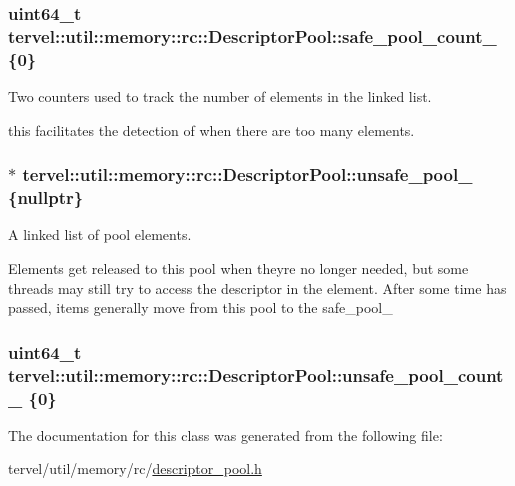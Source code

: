 \subsubsection[{safe\+\_\+pool\+\_\+count\+\_\+}]{\setlength{\rightskip}{0pt plus 5cm}uint64\+\_\+t tervel\+::util\+::memory\+::rc\+::\+Descriptor\+Pool\+::safe\+\_\+pool\+\_\+count\+\_\+ \{0\}\hspace{0.3cm}{\ttfamily [private]}}\label{classtervel_1_1util_1_1memory_1_1rc_1_1_descriptor_pool_a121f3c807724ee68f21faf5e659c2cf7}


Two counters used to track the number of elements in the linked list. 

this facilitates the detection of when there are too many elements. \hypertarget{classtervel_1_1util_1_1memory_1_1rc_1_1_descriptor_pool_a850e99b50092270ccc5e8529cffe294b}{}
\subsubsection[{unsafe\+\_\+pool\+\_\+}]{$\ast$ tervel\+::util\+::memory\+::rc\+::\+Descriptor\+Pool\+::unsafe\+\_\+pool\+\_\+ \{nullptr\}\hspace{0.3cm}{\ttfamily [private]}}\label{classtervel_1_1util_1_1memory_1_1rc_1_1_descriptor_pool_a850e99b50092270ccc5e8529cffe294b}


A linked list of pool elements. 

Elements get released to this pool when they\textquotesingle{}re no longer needed, but some threads may still try to access the descriptor in the element. After some time has passed, items generally move from this pool to the safe\+\_\+pool\+\_\+ \hypertarget{classtervel_1_1util_1_1memory_1_1rc_1_1_descriptor_pool_a8b8a73ac56132217ea75bd6f5d13ba98}{}
\subsubsection[{unsafe\+\_\+pool\+\_\+count\+\_\+}]{\setlength{\rightskip}{0pt plus 5cm}uint64\+\_\+t tervel\+::util\+::memory\+::rc\+::\+Descriptor\+Pool\+::unsafe\+\_\+pool\+\_\+count\+\_\+ \{0\}\hspace{0.3cm}{\ttfamily [private]}}\label{classtervel_1_1util_1_1memory_1_1rc_1_1_descriptor_pool_a8b8a73ac56132217ea75bd6f5d13ba98}


The documentation for this class was generated from the following file\+:\begin{DoxyCompactItemize}
\item 
tervel/util/memory/rc/\hyperlink{descriptor__pool_8h}{descriptor\+\_\+pool.\+h}\end{DoxyCompactItemize}
